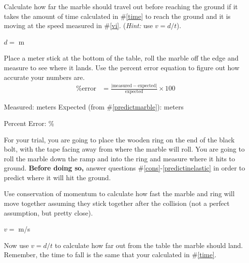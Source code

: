 \documentclass[10pt]{exam}
\begin{document}
\begin{questions}
\question \label{predictmarble}
Calculate how far the marble should travel out before reaching the ground if it takes the amount of time calculated in \#\ref{time} to reach the ground and it is moving at the speed measured in \#\ref{vi}. (\emph{Hint:} use $v = d/t$).
\vs

\begin{flushright}
  $d =$ \fillin[][8em] m
\end{flushright}

\question
Place a meter stick at the bottom of the table, roll the marble off the edge and measure to see where it lands. Use the percent error equation to figure out how accurate your numbers are.
%
\begin{align*}
  \text{\% error} &=  
  \frac{
    \left|\text{measured}-\text{expected}\right|
    }{
      \text{expected}
    } 
  \times 100
\end{align*}

\begin{center}
  Measured: \fillin[][8em] meters
  \hspace{4em}
  Expected (from \#\ref{predictmarble}): \fillin[][8em]  meters
  \vspace{2em}
\end{center}


\begin{flushright}
  Percent Error: \fillin[][5em]\%
\end{flushright}

\pagebreak

\begin{EnvUplevel}
  For your trial, you are going to place the wooden ring on the end of the black bolt, with the tape facing away from where the marble will roll. You are going to roll the marble down the ramp and into the ring and measure where it hits to ground.  {\bf Before doing so,} answer questions \#\ref{cons}-\ref{predictinelastic} in order to predict where it will hit the ground.
\end{EnvUplevel}


\question \label{cons}
Use conservation of momentum to calculate how fast the marble and ring will move together assuming they stick together after the collision (not a perfect assumption, but pretty close).
\vs[3]

\begin{flushright}
  $v =$ \fillin[][8em] m/s
\end{flushright}


\question \label{predictinelastic}
Now use $v = d/t$ to calculate how far out from the table the marble should land. Remember, the time to fall is the same that your calculated in \#\ref{time}.
\vs


\end{questions}
\end{document}
